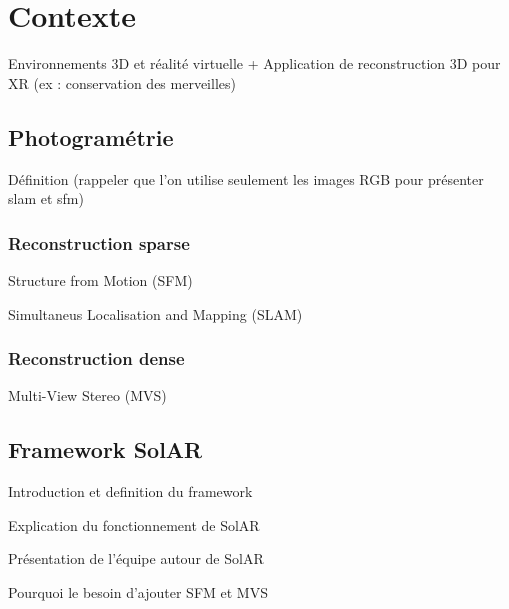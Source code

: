 \chapter{Contexte}

Environnements 3D et réalité virtuelle + Application de reconstruction 3D pour XR (ex : conservation des merveilles)

\section{Photogramétrie}

Définition (rappeler que l'on utilise seulement les images RGB pour présenter slam et sfm)

\subsection{Reconstruction sparse}

Structure from Motion (SFM)

Simultaneus Localisation and Mapping (SLAM)

\subsection{Reconstruction dense}

Multi-View Stereo (MVS)

\section{Framework SolAR}

Introduction et definition du framework


Explication du fonctionnement de SolAR

Présentation de l'équipe autour de SolAR

Pourquoi le besoin d'ajouter SFM et MVS

